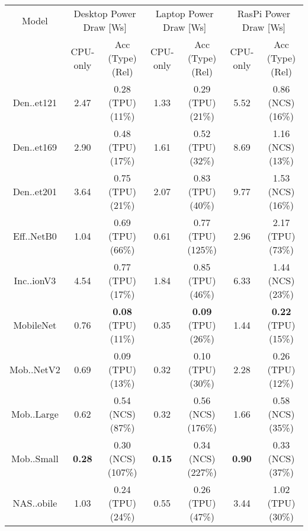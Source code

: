 \begin{tabular}{c|cc|cc|cc}
        Model & \multicolumn{2}{c}{Desktop Power Draw [Ws]} & \multicolumn{2}{c}{Laptop Power Draw [Ws]} & \multicolumn{2}{c}{RasPi Power Draw [Ws]} \\
         & CPU-only & Acc (Type) (Rel) & CPU-only & Acc (Type) (Rel) & CPU-only & Acc (Type) (Rel) \\
         \midrule
        Den..et121 & 2.47 & 0.28 (\colorbox{RC}{TPU}) (\colorbox{RA}{11\%}) & 1.33 & 0.29 (\colorbox{RC}{TPU}) (\colorbox{RC}{21\%}) & 5.52 & 0.86 (\colorbox{RA}{NCS}) (\colorbox{RA}{16\%}) \\
        Den..et169 & 2.90 & 0.48 (\colorbox{RC}{TPU}) (\colorbox{RA}{17\%}) & 1.61 & 0.52 (\colorbox{RC}{TPU}) (\colorbox{RC}{32\%}) & 8.69 & 1.16 (\colorbox{RA}{NCS}) (\colorbox{RA}{13\%}) \\
        Den..et201 & 3.64 & 0.75 (\colorbox{RC}{TPU}) (\colorbox{RC}{21\%}) & 2.07 & 0.83 (\colorbox{RC}{TPU}) (\colorbox{RC}{40\%}) & 9.77 & 1.53 (\colorbox{RA}{NCS}) (\colorbox{RA}{16\%}) \\
        Eff..NetB0 & 1.04 & 0.69 (\colorbox{RC}{TPU}) (\colorbox{RE}{66\%}) & 0.61 & 0.77 (\colorbox{RC}{TPU}) (\colorbox{RE}{125\%}) & 2.96 & 2.17 (\colorbox{RC}{TPU}) (\colorbox{RE}{73\%}) \\
        Inc..ionV3 & 4.54 & 0.77 (\colorbox{RC}{TPU}) (\colorbox{RA}{17\%}) & 1.84 & 0.85 (\colorbox{RC}{TPU}) (\colorbox{RC}{46\%}) & 6.33 & 1.44 (\colorbox{RA}{NCS}) (\colorbox{RC}{23\%}) \\
        MobileNet & 0.76 & \textbf{0.08} (\colorbox{RC}{TPU}) (\colorbox{RA}{11\%}) & 0.35 & \textbf{0.09} (\colorbox{RC}{TPU}) (\colorbox{RC}{26\%}) & 1.44 & \textbf{0.22} (\colorbox{RC}{TPU}) (\colorbox{RA}{15\%}) \\
        Mob..NetV2 & 0.69 & 0.09 (\colorbox{RC}{TPU}) (\colorbox{RA}{13\%}) & 0.32 & 0.10 (\colorbox{RC}{TPU}) (\colorbox{RC}{30\%}) & 2.28 & 0.26 (\colorbox{RC}{TPU}) (\colorbox{RA}{12\%}) \\
        Mob..Large & 0.62 & 0.54 (\colorbox{RA}{NCS}) (\colorbox{RE}{87\%}) & 0.32 & 0.56 (\colorbox{RA}{NCS}) (\colorbox{RE}{176\%}) & 1.66 & 0.58 (\colorbox{RA}{NCS}) (\colorbox{RC}{35\%}) \\
        Mob..Small & \textbf{0.28}  & 0.30 (\colorbox{RA}{NCS}) (\colorbox{RE}{107\%}) & \textbf{0.15}  & 0.34 (\colorbox{RA}{NCS}) (\colorbox{RE}{227\%}) & \textbf{0.90}  & 0.33 (\colorbox{RA}{NCS}) (\colorbox{RC}{37\%}) \\
        NAS..obile & 1.03 & 0.24 (\colorbox{RC}{TPU}) (\colorbox{RC}{24\%}) & 0.55 & 0.26 (\colorbox{RC}{TPU}) (\colorbox{RC}{47\%}) & 3.44 & 1.02 (\colorbox{RC}{TPU}) (\colorbox{RC}{30\%}) \\

\end{tabular}
